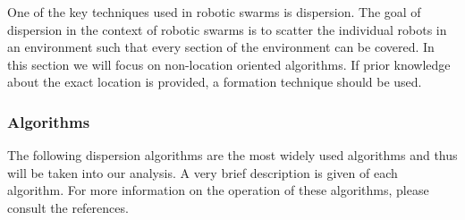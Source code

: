 
One of the key techniques used in robotic swarms is dispersion. The goal of dispersion in the context of robotic swarms is to scatter the individual robots in an environment such that every section of the environment can be covered. In this section we will focus on non-location oriented algorithms. If prior knowledge about the exact location is provided, a formation technique should be used.

\subsubsection{Algorithms}
	The following dispersion algorithms are the most widely used algorithms and thus will be taken into our analysis. A very brief description is given of each algorithm. For more information on the operation of these algorithms, please consult the references.\\


